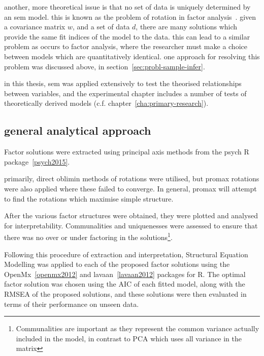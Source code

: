 another, more theoretical issue is that no set of data is uniquely determined by an sem model. this is known as the problem of rotation in factor analysis~\cite{maccallum2000applications}. given a covariance matrix $w$, and a set of data $d$, there are many solutions which provide the same fit indices of the model to the data. this can lead to a similar problem as occurs to factor analysis, where the researcher must make a choice between models which are quantitatively identical. one approach for resolving this problem was discussed above, in section~\ref{sec:probl-sample-infer}.

in this thesis, sem was applied extensively to test the theorised relationships between variables, and the experimental chapter includes a number of tests of theoretically derived models (c.f. chapter~\ref{cha:primary-research}).

\subsection{general analytical approach}
\label{sec:gener-analyt-appr}


Factor solutions were extracted using principal axis methods from the psych R package~\ref{psych2015}.

primarily, direct oblimin methods of rotations were utilised, but promax rotations were also applied where these failed to converge. In general, promax will attempt to find the rotations which maximise simple structure. 

After the various factor structures were obtained, they were plotted and analysed for interpretability. Communalities and uniquenesses were assessed to ensure that there was no over or under factoring in the solutions\footnote{Communalities are important as they represent the common variance actually included in the model, in contrast to PCA which uses all variance in the matrix}. %

Following this procedure of extraction and interpretation, Structural Equation Modelling was applied to each of the proposed factor solutions using the OpenMx~\ref{openmx2012} and lavaan~\ref{lavaan2012} packages for R. The optimal factor solution was chosen using the AIC of each fitted model, along with the RMSEA of the proposed solutions, and these solutions were then evaluated in terms of their performance on unseen data. 


